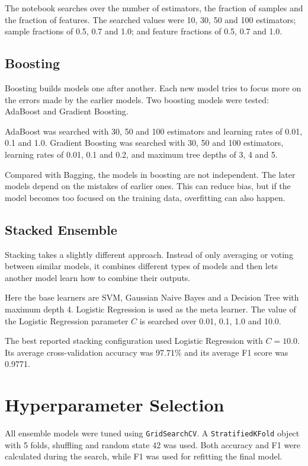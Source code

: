 \documentclass[12pt,a4paper]{article}
\begin{document}
The notebook searches over the number of estimators, the fraction of samples and the fraction of features. The searched values were 10, 30, 50 and 100 estimators; sample fractions of 0.5, 0.7 and 1.0; and feature fractions of 0.5, 0.7 and 1.0.

\subsection{Boosting}
Boosting builds models one after another. Each new model tries to focus more on the errors made by the earlier models. Two boosting models were tested: AdaBoost and Gradient Boosting.

AdaBoost was searched with 30, 50 and 100 estimators and learning rates of 0.01, 0.1 and 1.0. Gradient Boosting was searched with 30, 50 and 100 estimators, learning rates of 0.01, 0.1 and 0.2, and maximum tree depths of 3, 4 and 5.

Compared with Bagging, the models in boosting are not independent. The later models depend on the mistakes of earlier ones. This can reduce bias, but if the model becomes too focused on the training data, overfitting can also happen.

\subsection{Stacked Ensemble}
Stacking takes a slightly different approach. Instead of only averaging or voting between similar models, it combines different types of models and then lets another model learn how to combine their outputs.

Here the base learners are SVM, Gaussian Naive Bayes and a Decision Tree with maximum depth 4. Logistic Regression is used as the meta learner. The value of the Logistic Regression parameter $C$ is searched over 0.01, 0.1, 1.0 and 10.0.

The best reported stacking configuration used Logistic Regression with $C=10.0$. Its average cross-validation accuracy was 97.71\% and its average F1 score was 0.9771.

\section{Hyperparameter Selection}
All ensemble models were tuned using \texttt{GridSearchCV}. A \texttt{StratifiedKFold} object with 5 folds, shuffling and random state 42 was used. Both accuracy and F1 were calculated during the search, while F1 was used for refitting the final model.
\end{document}
